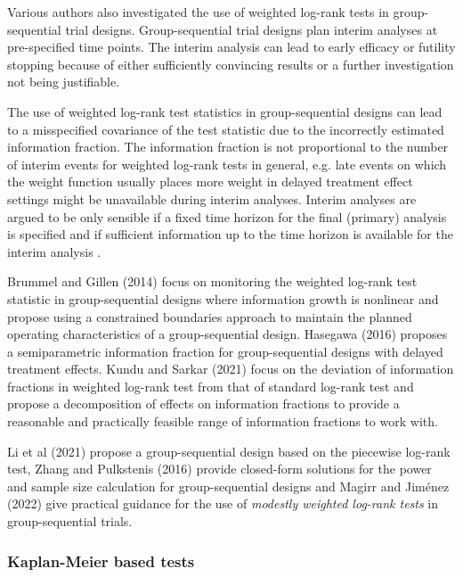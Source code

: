 \noindent 

\noindent Various authors also investigated the use of weighted log-rank tests in group-sequential trial designs. Group-sequential trial designs plan interim analyses at pre-specified time points. The interim analysis can lead to early efficacy or futility stopping because of either sufficiently convincing results or a further investigation not being justifiable.

\noindent The use of weighted log-rank test statistics in group-sequential designs can lead to a misspecified covariance of the test statistic due to the incorrectly estimated information fraction. The information fraction is not proportional to the number of interim events for weighted log-rank tests in general, e.g. late events on which the weight function usually places more weight in delayed treatment effect settings might be unavailable during interim analyses. Interim analyses are argued to be only sensible if a fixed time horizon for the final (primary) analysis is specified and if sufficient information up to the time horizon is available for the  interim analysis \cite{vanHouwelingen.2005}.

\noindent Brummel and Gillen (2014) \cite{Brummel.2014} focus on monitoring the weighted log-rank test statistic in group-sequential designs where information growth is nonlinear and propose using a constrained boundaries approach to maintain the planned operating characteristics of a group-sequential design. Hasegawa (2016) \cite{Hasegawa.2016} proposes a semiparametric  information fraction for group-sequential designs with delayed treatment effects. Kundu and Sarkar (2021) \cite{Kundu.2021} focus on the deviation of information fractions in weighted log-rank test from that of standard log-rank test and propose a decomposition of effects on information fractions to provide a reasonable and practically feasible range of information fractions to work with.

\noindent Li et al (2021) \cite{Li.2021} propose a group-sequential design based on the piecewise log-rank test,  Zhang and Pulkstenis (2016) \cite{Zhang.2016} provide closed-form solutions for the power and sample size calculation for group-sequential designs and Magirr and Jim\'{e}nez (2022) \cite{Magirr.2022} give practical guidance for the use of \textit{modestly weighted log-rank tests} in group-sequential trials.

\noindent 

\noindent \textit{}


\subsubsection{Kaplan-Meier based tests} \label{KM_test}

